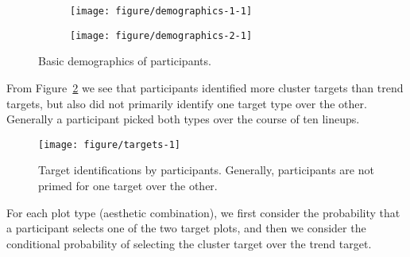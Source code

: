 \documentclass[12pt]{article}\usepackage[]{graphicx}\usepackage[]{color}
\newenvironment{knitrout}{}{} %
\begin{document}
\begin{figure}[ht]
\begin{subfigure}[t]{0.55\linewidth}
\begin{knitrout}
\color{fgcolor}

{\centering \texttt{[image: figure/demographics-1-1]} 

}



\end{knitrout}
\end{subfigure}
\begin{subfigure}[t]{0.43\linewidth}
\begin{knitrout}
\color{fgcolor}

{\centering \texttt{[image: figure/demographics-2-1]} 

}



\end{knitrout}
\end{subfigure}
\caption{\label{fig:demographics}Basic demographics of participants.}
\end{figure}


From Figure~\ref{fig:targets} we see that participants identified more cluster targets than trend targets, but also did not primarily identify one target type over the other. Generally a participant picked both types over the course of ten lineups.

\begin{figure}[ht]
\centering
\begin{knitrout}
\color{fgcolor}

{\centering \texttt{[image: figure/targets-1]} 

}



\end{knitrout}
\caption{\label{fig:targets}Target identifications by participants. Generally,  participants are not primed for one target over the other.}
\end{figure}

For each plot type (aesthetic combination), we first consider the probability that a participant selects one of the two target plots, and then we consider the conditional probability of selecting the cluster target  over the trend target. 
\end{document}
